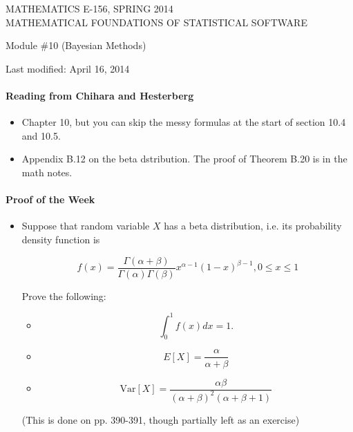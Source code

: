 \documentclass[12pt]{article}
\begin{document}
\begin{center}
MATHEMATICS E-156, SPRING 2014 \\
MATHEMATICAL FOUNDATIONS OF STATISTICAL SOFTWARE

\smallskip

Module \#10 (Bayesian Methods)
\end{center}

Last modified: April 16, 2014

\medskip

\paragraph*{Reading from Chihara and Hesterberg}

\begin{itemize}
\item Chapter 10, but you can skip the messy formulas at the start of section 10.4 and 10.5.

\item Appendix B.12 on the beta dstribution. The proof of Theorem B.20 is in the math notes.
\end{itemize}

\paragraph*{Proof of the Week}
\begin{itemize}
\item  Suppose that random variable $X$ has a beta distribution, i.e. its probability density function is

$$f(x) = \frac{\Gamma(\alpha + \beta)}{\Gamma(\alpha)\Gamma(\beta)} x^{\alpha-1}(1-x)^{\beta-1}, 0 \leq x \leq 1$$

Prove the following:
\begin{itemize}
\item $$\int_0^1 f(x) dx  = 1.$$
\item $$E[X] = \frac{\alpha}{\alpha + \beta}$$
\item $$\text{Var}[X] = \frac{\alpha\beta}{(\alpha + \beta)^2(\alpha + \beta+1)}$$


\end{itemize}

(This is done on pp. 390-391, though partially left as an exercise)
\end{itemize}

\pagebreak
\end{document}
